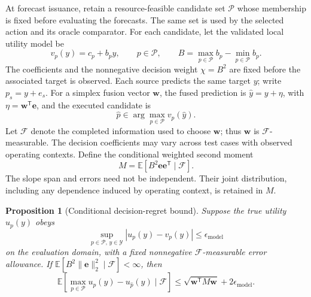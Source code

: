 \documentclass[10pt]{article}
\newtheorem{proposition}{Proposition}
\begin{document}
At forecast issuance, retain a resource-feasible candidate set $\mathcal P$
whose membership is fixed before evaluating the forecasts. The same set is
used by the selected action and its oracle comparator. For each candidate,
let the validated local utility model be
\begin{equation}
 v_p(y)=c_p+b_p y,\qquad p\in\mathcal P,
 \qquad B=\max_{p\in\mathcal P}b_p-\min_{p\in\mathcal P}b_p.
 \label{eq:utility-slope-span}
\end{equation}
The coefficients and the nonnegative decision weight $\chi=B^2$ are fixed
before the associated target is observed. Each source predicts the same
target $y$; write $p_s=y+e_s$. For a simplex fusion vector $\boldsymbol w$,
the fused prediction is $\widehat y=y+\eta$, with
$\eta=\boldsymbol w^{\mathsf T}\boldsymbol e$, and the executed candidate is
\begin{equation}
 \widehat p\in\arg\max_{p\in\mathcal P}v_p(\widehat y).
\end{equation}
Let $\mathcal F$ denote the completed information used to choose
$\boldsymbol w$; thus $\boldsymbol w$ is $\mathcal F$-measurable. The
decision coefficients may vary across test cases with observed operating
contexts. Define the conditional weighted second moment
\begin{equation}
 M=\mathbb E[B^2\boldsymbol e\boldsymbol e^{\mathsf T}\mid\mathcal F].
 \label{eq:decision-weighted-second-moment}
\end{equation}
The slope span and errors need not be independent. Their joint distribution,
including any dependence induced by operating context, is retained in $M$.

\begin{proposition}[Conditional decision-regret bound]
\label{prop:decision-weighted-regret}
Suppose the true utility $u_p(y)$ obeys
\begin{equation}
 \sup_{p\in\mathcal P,\,y\in\mathcal Y}
 |u_p(y)-v_p(y)|\le\epsilon_{\mathrm{model}}
 \label{eq:local-utility-model-error}
\end{equation}
on the evaluation domain, with a fixed nonnegative
$\mathcal F$-measurable error allowance. If
$\mathbb E[B^2\|\boldsymbol e\|_2^2\mid\mathcal F]<\infty$, then
\begin{equation}
 \mathbb E\!\left[
 \max_{p\in\mathcal P}u_p(y)-u_{\widehat p}(y)
 \mid\mathcal F\right]
 \le\sqrt{\boldsymbol w^{\mathsf T}M\boldsymbol w}
       +2\epsilon_{\mathrm{model}}.
 \label{eq:decision-regret-bound}
\end{equation}
\end{proposition}
\end{document}
